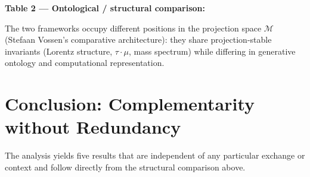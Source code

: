 \textbf{Table 2 — Ontological / structural comparison:}

\begin{center}
\renewcommand{\arraystretch}{1.4}
{\small
{}
}
\end{center}

The two frameworks occupy different positions in the projection space $\mathcal{M}$
(Stefaan Vossen's comparative architecture): they share projection-stable
invariants (Lorentz structure, $\tau\cdot\mu$, mass spectrum) while differing
in generative ontology and computational representation.

\section{Conclusion: Complementarity without Redundancy}

The analysis yields five results that are independent of any particular
exchange or context and follow directly from the structural comparison above.

